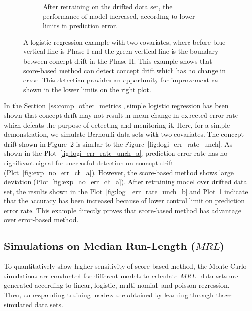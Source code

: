 \documentclass[twoside,11pt]{article}
\begin{document}
\begin{figure}[!htp]
\begin{subfigure}[t]{0.49\linewidth}
         \caption{After retraining on the drifted data set, the performance of model increased, according to lower limits in prediction error.}
         \label{fig:exp_no_err_ch_b}
  \end{subfigure}
  \caption{A logistic regression example with two covariates, where before blue vertical line is Phase-I and the green vertical line is the boundary between concept drift in the Phase-II. This example shows that score-based method can detect concept drift which has no change in error. This detection provides an opportunity for improvement as shown in the lower limits on the right plot.}
  \label{fig:exp_no_err_ch}
\end{figure}
In the Section~\ref{ss:comp_other_metrics}, simple logistic regression has been shown that concept drift may not result in mean change in expected error rate which defeats the purpose of detecting and monitoring it. Here, for a simple demonstration, we simulate Bernoulli data sets with two covariates. The concept drift shown in Figure~\ref{fig:exp_no_err_ch} is similar to the Figure~\ref{fig:logi_err_rate_unch}. As shown in the Plot~\ref{fig:logi_err_rate_unch_a}, prediction error rate has no significant signal for successful detection on concept drift (Plot~\ref{fig:exp_no_err_ch_a}). However, the score-based method shows large deviation (Plot~\ref{fig:exp_no_err_ch_a}). After retraining model over drifted data set, the results shown in the Plot~\ref{fig:logi_err_rate_unch_b} and Plot~\ref{fig:exp_no_err_ch_b} indicate that the accuracy has been increased because of lower control limit on prediction error rate. This example directly proves that score-based method has advantage over error-based method. 

\subsection{Simulations on Median Run-Length ($MRL$)}
\label{ss:simu_MRL}
To quantitatively show higher sensitivity of score-based method, the Monte Carlo simulations are conducted for different models to calculate $MRL$. data sets are generated according to linear, logistic, multi-nomial, and poisson regression. Then, corresponding training models are obtained by learning through those simulated data sets.
\end{document}
